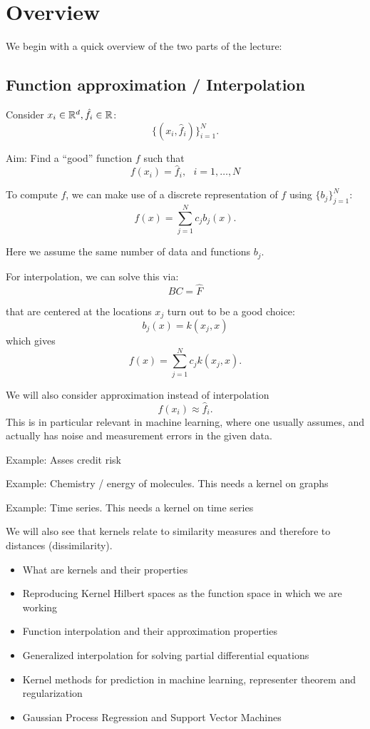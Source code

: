 \section{Overview}

We begin with a quick overview of the two parts of the lecture:

\subsection{Function approximation / Interpolation}

Consider $x_i\in\mathbb{R}^d,\hat{f}_i\in\mathbb{R}$:
\[\{(x_i,\hat{f}_i)\}_{i=1}^N.\]

Aim: Find a ``good''  function $f$ such that 
\[f(x_i)=\hat{f}_i,\text{  } i=1,\dots,N\]

To compute $f$, we can make use of a discrete representation of $f$ using 
$\{b_j\}_{j=1}^N$:
\[f(x)=\sum_{j=1}^N c_j b_j(x).\]

Here we assume the same number of data and functions $b_j$.

For interpolation, we can solve this via:
\[BC=\hat{F}\]

 that are centered at the locations $x_j$ turn out to be a good choice:
\[b_j(x)=k(x_j,x)\]
which gives
\[f(x)=\sum_{j=1}^N c_j k(x_j,x).\]

We will also consider approximation instead of interpolation
\[f(x_i)\approx \hat{f}_i.\]
This is in particular relevant in machine learning, 
where one usually assumes, 
and actually has noise and measurement errors in the given data.

Example: Asses credit risk

Example: Chemistry / energy of molecules. This needs a kernel on graphs

Example: Time series. This needs a kernel on time series

\begin{remark}
    We will also see that kernels relate to similarity measures and therefore to distances (dissimilarity).
\end{remark}

\begin{itemize}
    \item What are kernels and their properties
    \item Reproducing Kernel Hilbert spaces as the function space in which we are working
    \item Function interpolation and their approximation properties
    \item Generalized interpolation for solving partial differential equations
    \item Kernel methods for prediction in machine learning, representer theorem and regularization
    \item Gaussian Process Regression and Support Vector Machines
\end{itemize}

